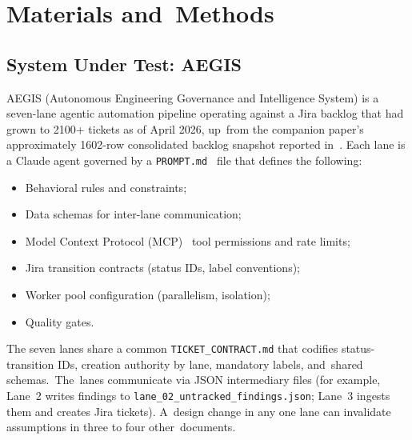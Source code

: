 \documentclass[software,article,accept,pdftex,oneauthor]{Definitions/mdpi}
\renewcommand{\highlighting}[1]{#1}
\def\hl#1{#1}
\begin{document}
\section{\highlighting{Materials and~Methods} %
}
\label{sec:methods}
\unskip

\subsection{System Under Test: AEGIS}

AEGIS (Autonomous Engineering Governance and Intelligence System) is a seven-lane agentic automation pipeline operating against a Jira backlog that had grown to 2100+ tickets as of April 2026, up~from the companion paper's approximately 1602-row consolidated backlog snapshot reported in~\cite{calboreanu2026aegis_companion}. Each lane is a Claude agent governed by a \texttt{\hl{PROMPT.md}%
} file that defines the following:

\begin{itemize}
\item Behavioral rules and constraints;
\item Data schemas for inter-lane communication;
\item Model Context Protocol (MCP)~\cite{anthropic2024mcp} tool permissions and rate limits;
\item Jira transition contracts (status IDs, label conventions);
\item Worker pool configuration (parallelism, isolation);
\item Quality gates.
\end{itemize}

The seven lanes share a common \texttt{\hl{TICKET\_CONTRACT.md}} that codifies status-transition IDs, creation authority by lane, mandatory labels, and~shared schemas.~The~lanes communicate via JSON intermediary files (for example, Lane~2 writes findings to \texttt{\hl{lane\_02\_untracked\_findings.json}}; Lane~3 ingests them and creates Jira tickets). A~design change in any one lane can invalidate assumptions in three to four other~documents.
\end{document}
